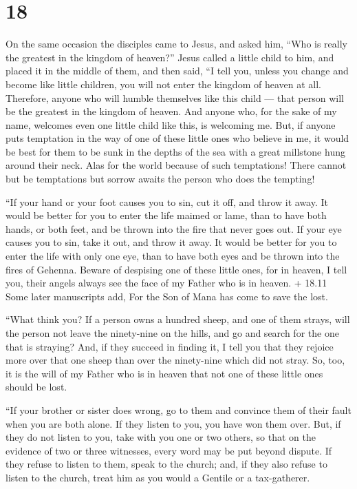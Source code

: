 \hypertarget{section-17}{%
\section{18}\label{section-17}}

 On the same occasion the disciples came to Jesus, and asked
him, ``Who is really the greatest in the kingdom of heaven?''
 Jesus called a little child to him, and placed it in the
middle of them, and then said,  ``I tell you, unless you
change and become like little children, you will not enter the kingdom
of heaven at all.  Therefore, anyone who will humble
themselves like this child --- that person will be the greatest in the
kingdom of heaven.  And anyone who, for the sake of my name,
welcomes even one little child like this, is welcoming me. 
But, if anyone puts temptation in the way of one of these little ones
who believe in me, it would be best for them to be sunk in the depths of
the sea with a great millstone hung around their neck.  Alas
for the world because of such temptations! There cannot but be
temptations but sorrow awaits the person who does the tempting!

 ``If your hand or your foot causes you to sin, cut it off,
and throw it away. It would be better for you to enter the life maimed
or lame, than to have both hands, or both feet, and be thrown into the
fire that never goes out.  If your eye causes you to sin,
take it out, and throw it away. It would be better for you to enter the
life with only one eye, than to have both eyes and be thrown into the
fires of Gehenna.  Beware of despising one of these little
ones, for in heaven, I tell you, their angels always see the face of my
Father who is in heaven.  + 18.11 Some later manuscripts
add, For the Son of Mana has come to save the lost.

 ``What think you? If a person owns a hundred sheep, and
one of them strays, will the person not leave the ninety-nine on the
hills, and go and search for the one that is straying? 
And, if they succeed in finding it, I tell you that they rejoice more
over that one sheep than over the ninety-nine which did not stray.
 So, too, it is the will of my Father who is in heaven that
not one of these little ones should be lost.

 ``If your brother or sister does wrong, go to them and
convince them of their fault when you are both alone. If they listen to
you, you have won them over.  But, if they do not listen to
you, take with you one or two others, so that on the evidence of two or
three witnesses, every word may be put beyond dispute.  If
they refuse to listen to them, speak to the church; and, if they also
refuse to listen to the church, treat him as you would a Gentile or a
tax-gatherer.

